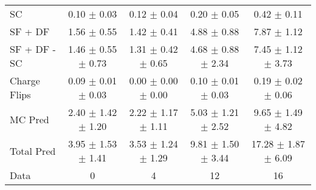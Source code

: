 \begin{tabular}{l|cccc}
                                 SC &  0.10 $\pm$  0.03 &  0.12 $\pm$  0.04 &  0.20 $\pm$  0.05 &  0.42 $\pm$  0.11 \\
                            SF + DF &  1.56 $\pm$  0.55 &  1.42 $\pm$  0.41 &  4.88 $\pm$  0.88 &  7.87 $\pm$  1.12 \\
\hline
                       SF + DF - SC &  1.46 $\pm$  0.55 $\pm$  0.73 &  1.31 $\pm$  0.42 $\pm$  0.65 &  4.68 $\pm$  0.88 $\pm$  2.34 &  7.45 $\pm$  1.12 $\pm$  3.73 \\
\hline\hline
                       Charge Flips &  0.09 $\pm$  0.01 $\pm$  0.03 &  0.00 $\pm$  0.00 $\pm$  0.00 &  0.10 $\pm$  0.01 $\pm$  0.03 &  0.19 $\pm$  0.02 $\pm$  0.06 \\
\hline
                            MC Pred &  2.40 $\pm$  1.42 $\pm$  1.20 &  2.22 $\pm$  1.17 $\pm$  1.11 &  5.03 $\pm$  1.21 $\pm$  2.52 &  9.65 $\pm$  1.49 $\pm$  4.82 \\
\hline
                         Total Pred &  3.95 $\pm$  1.53 $\pm$  1.41 &  3.53 $\pm$  1.24 $\pm$  1.29 &  9.81 $\pm$  1.50 $\pm$  3.44 & 17.28 $\pm$  1.87 $\pm$  6.09 \\
\hline\hline
                               Data &     0 &     4 &    12 &    16 \\
\hline\hline
\end{tabular}

